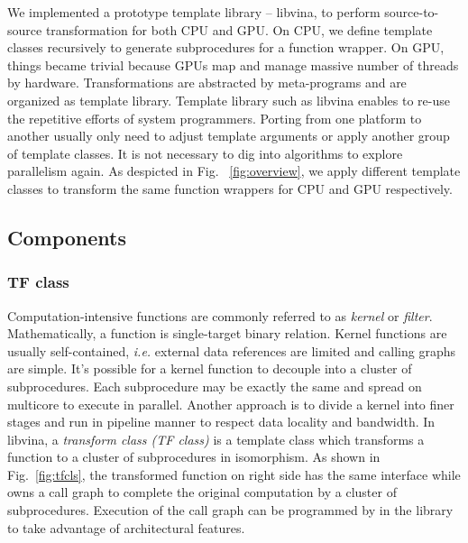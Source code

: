 \documentclass[10pt, conference, compsocconf]{IEEEtran}
\begin{document}
We implemented a prototype template library -- libvina, to perform source-to-source
transformation for both CPU and GPU. On CPU, we define template
classes recursively to generate subprocedures for a function wrapper. On GPU, things became trivial because GPUs map and
manage massive number of threads by hardware. Transformations are
abstracted by meta-programs and are organized as template
library. Template library such as libvina enables to re-use
the repetitive efforts of system programmers.  Porting
from one platform to another usually  only need to adjust
template arguments or apply another group of template classes. It is not necessary to
dig into algorithms to explore parallelism again. As despicted in
Fig. ~\ref{fig:overview}, we apply different template classes to
transform the same function wrappers for CPU and GPU respectively.



\subsection{Components}
\subsubsection{TF class}
Computation-intensive functions are commonly referred to as
\emph{kernel} or \emph{filter}. Mathematically, a function is
single-target binary relation. Kernel functions are usually
self-contained, \textit{i.e.} external data references are limited and
calling graphs are simple. It's possible for a kernel function to
decouple into a cluster of subprocedures. Each subprocedure may be
exactly the same and spread on multicore to execute in
parallel.  Another approach is to divide a kernel into finer stages
and run in pipeline manner to respect data locality and bandwidth. In
libvina, a \emph{transform class (TF class)} is a template class which
transforms a function to a cluster of subprocedures in isomorphism. As
shown in Fig.~\ref{fig:tfcls}, the transformed function on right side
has the same interface while owns a call graph to complete the
original computation by a cluster of subprocedures. Execution of the
call graph can be programmed by in the library to take advantage of
architectural features.
\end{document}
